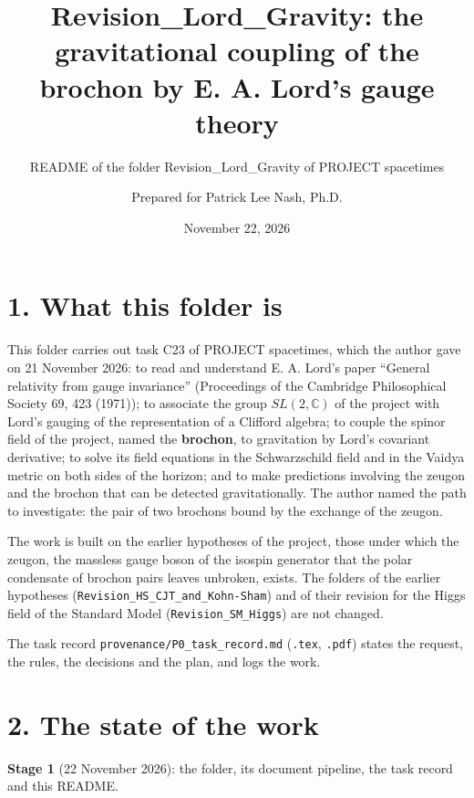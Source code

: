 \documentclass[
  10pt,
]{article}
\title{Revision\_Lord\_Gravity: the gravitational coupling of the
brochon by E. A. Lord's gauge theory}
\subtitle{README of the folder Revision\_Lord\_Gravity of PROJECT
spacetimes}
\author{Prepared for Patrick Lee Nash, Ph.D.}
\date{November 22, 2026}
\begin{document}
\maketitle

\hypertarget{what-this-folder-is}{%
\section{1. What this folder is}\label{what-this-folder-is}}

This folder carries out task C23 of PROJECT spacetimes, which the author
gave on 21 November 2026: to read and understand E. A. Lord's paper
``General relativity from gauge invariance'' (Proceedings of the
Cambridge Philosophical Society 69, 423 (1971)); to associate the group
\(SL(2,\mathbb C)\) of the project with Lord's gauging of the
representation of a Clifford algebra; to couple the spinor field of the
project, named the \textbf{brochon}, to gravitation by Lord's covariant
derivative; to solve its field equations in the Schwarzschild field and
in the Vaidya metric on both sides of the horizon; and to make
predictions involving the zeugon and the brochon that can be detected
gravitationally. The author named the path to investigate: the pair of
two brochons bound by the exchange of the zeugon.

The work is built on the earlier hypotheses of the project, those under
which the zeugon, the massless gauge boson of the isospin generator that
the polar condensate of brochon pairs leaves unbroken, exists. The
folders of the earlier hypotheses
(\texttt{Revision\_HS\_CJT\_and\_Kohn-Sham}) and of their revision for
the Higgs field of the Standard Model (\texttt{Revision\_SM\_Higgs}) are
not changed.

The task record \texttt{provenance/P0\_task\_record.md} (\texttt{.tex},
\texttt{.pdf}) states the request, the rules, the decisions and the
plan, and logs the work.

\hypertarget{the-state-of-the-work}{%
\section{2. The state of the work}\label{the-state-of-the-work}}

\textbf{Stage 1} (22 November 2026): the folder, its document pipeline,
the task record and this README.
\end{document}
